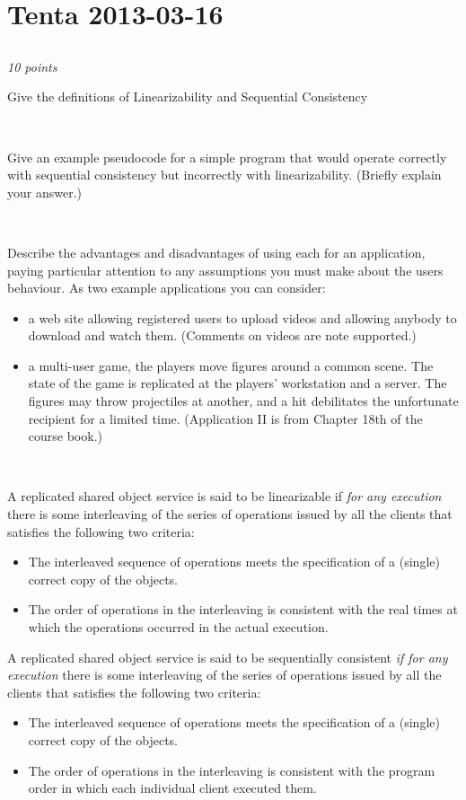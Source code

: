 \documentclass[a4paper]{article}
\newcommand{\points}[1]{\subsection{} \textit{#1 points}\\}
\newcommand{\question}[2][]{
  \parbox[t]{\textwidth}{
    \ifthenelse{\equal{#1}{}}{}{#1)}
    \parbox[t]{0.95\textwidth}{#2}}\\}
\newcommand{\solution}[2][]{
  \ifthenelse{\equal{#1}{} \or \equal{#1}{a}}{\\[3pt]\textit{Solution: }\\[0.1cm]}{}
  \question[#1]{#2}
}
\newcommand{\highlight}[1]{{\color{blue}#1}}
\begin{document}
\section{Tenta 2013-03-16}
\points{10}
\label{2013-03:linearizability}
\question[a]{
  Give the definitions of Linearizability and Sequential Consistency
}
\question[b]{
  Give an example pseudocode for a simple program that
  would operate correctly with sequential consistency but incorrectly
  with linearizability. (Briefly explain your answer.)
}
\question[c]{
  Describe the advantages and disadvantages of using each
  for an application, paying particular attention to any assumptions
  you must make about the users behaviour. As two example applications
  you can consider:
  \begin{itemize}
    \item a web site allowing registered users to upload videos and
      allowing anybody to download and watch them. (Comments on videos
      are note supported.)
    \item a multi-user game, the players move figures around a common
      scene. The state of the game is replicated at the players'
      workstation and a server. The figures may throw projectiles at
      another, and a hit debilitates the unfortunate recipient for a
      limited time. (Application II is from Chapter 18th of the course
      book.)
  \end{itemize}
}
\solution[a]{A replicated shared object service is said to be
  \highlight{linearizable} if \textit{for any execution} there is
  some interleaving of the series of operations issued by all the
  clients that satisfies the following two criteria:
  \begin{itemize}
    \item The interleaved sequence of operations meets the
      specification of a (single) correct copy of the objects.
    \item The order of operations in the interleaving is consistent
      with the \highlight{real times at which the operations
        occurred in the actual execution.}
  \end{itemize}

  A replicated shared object service is said to be
  \highlight{sequentially consistent} \textit{if for any
    execution} there is some interleaving of the series of operations
  issued by all the clients that satisfies the following two criteria:
  \begin{itemize}
    \item The interleaved sequence of operations meets the
      specification of a (single) correct copy of the objects.
    \item The order of operations in the interleaving is consistent
      with the \highlight{program order in which each individual
        client executed them.}
  \end{itemize}
}
\end{document}
